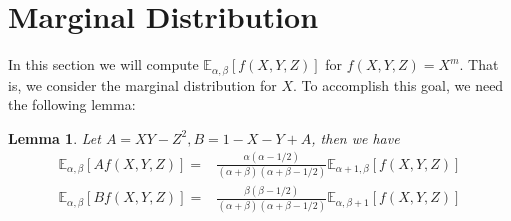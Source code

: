 \documentclass{elsarticle}
\def\E{\mathbb{E}}
\newtheorem{lemma}{Lemma}
\begin{document}
\section{Marginal Distribution}
In this section we will compute $\E_{\alpha,\beta}[f(X,Y, Z)]$
for $f(X,Y,Z)=X^m$. That is, we consider the marginal distribution for $X$.
To accomplish this goal, we need the following lemma:
\begin{lemma}
Let $A = XY - Z^2, B = 1 - X - Y + A$, then we have
\begin{align}
\E_{\alpha, \beta}[Af(X,Y,Z)] =&
\frac{\alpha(\alpha-1/2)}{(\alpha+\beta)(\alpha+\beta-1/2)}\E_{\alpha+1, \beta}[f(X,Y,Z)] \\
\E_{\alpha,\beta}[Bf(X,Y,Z)] =& \frac{\beta(\beta-1/2)}{(\alpha+\beta)(\alpha+\beta-1/2)}\E_{\alpha, \beta+1}[f(X,Y,Z)]
\end{align}
\end{lemma}


\end{document}
